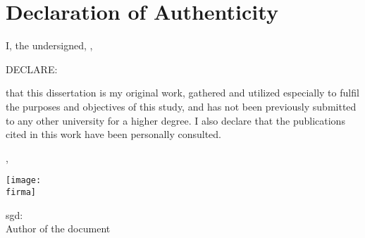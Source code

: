 

\chapter*{\centering Declaration of Authenticity}

\vspace{1cm}

I, the undersigned, \textbf{\miNombre}, 

\vspace{0.5cm}

DECLARE:

\vspace{0.5cm}

that this dissertation is my original work, gathered and utilized especially to fulfil the purposes and objectives of this study, and has not been previously submitted to any other university for a higher degree. I also declare that the publications cited in this work have been personally consulted.


\begin{center}\miUbicacion, \Hoy\end{center}

\begin{center}\texttt{[image: \\firma]}\end{center}

\begin{center}sgd: \miNombre\\
Author of the document\end{center}


\restoregeometry
